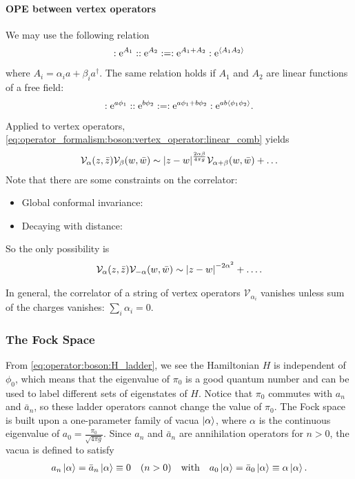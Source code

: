 \documentclass[10pt]{article}
\newcommand{\me}{\mathrm{e}}
\begin{document}
\paragraph{OPE between vertex operators}
We may use the following relation 
\begin{align}
    :\me^{A_1}::\me^{A_2}:=:\me^{A_1+A_2}:\me^{\expval{A_1 A_2}}
\end{align}
where $A_i=\alpha_i a+\beta_i a^\dagger$.
The same relation holds if $A_1$ and $A_2$ are linear functions of a free field:
\begin{align}\label{eq:operator_formalism:boson:vertex_operator:linear_comb}
    :\me^{a\phi_1}::\me^{b\phi_2}:=:\me^{a\phi_1+b\phi_2}:\me^{ab\expval{\phi_1 \phi_2}}.
\end{align}
Applied to vertex operators, \cref{eq:operator_formalism:boson:vertex_operator:linear_comb} yields
\begin{align}
    \mathcal{V}_\alpha(z,\bar{z})\mathcal{V}_\beta(w,\bar{w})\sim\abs{z-w}^{\frac{2\alpha\beta}{4\pi g}}\mathcal{V}_{\alpha+\beta}(w,\bar{w})+\dots
\end{align}
Note that there are some constraints on the correlator: 
\begin{itemize}
    \item Global conformal invariance: 
    \item Decaying with distance:
\end{itemize}
So the only possibility is 
\begin{align}
    \mathcal{V}_\alpha(z,\bar{z})\mathcal{V}_{-\alpha}(w,\bar{w})\sim\abs{z-w}^{-2\alpha^2}+\dots.
\end{align}
\begin{remark}
    In general, the correlator of a string of vertex operators $\mathcal{V}_{\alpha_i}$ vanishes unless sum of the charges vanishes: $\sum_i\alpha_i=0$.
\end{remark}
\subsubsection{The Fock Space}
From \cref{eq:operator:boson:H_ladder}, we see the Hamiltonian $H$ is independent of $\phi_0$, which means that the eigenvalue of $\pi_0$ is a good quantum number and can be used to label different sets of eigenstates of $H$.
Notice that $\pi_0$ commutes with $a_n$ and $\bar{a}_n$, so these ladder operators cannot change the value of $\pi_0$.
The Fock space is built upon a one-parameter family of vacua $\ket{\alpha}$, where $\alpha$ is the continuous eigenvalue of $a_0=\frac{\pi_0}{\sqrt{4\pi g}}$.
Since $a_n$ and $\bar{a}_n$ are annihilation operators for $n>0$, the vacua is defined to satisfy
\begin{align}
    a_n\ket{\alpha}=\bar{a}_n\ket{\alpha}\equiv0\quad(n>0)\quad\text{with}\quad a_0\ket{\alpha}=\bar{a}_0\ket{\alpha}\equiv\alpha\ket{\alpha}.
\end{align}
\end{document}
